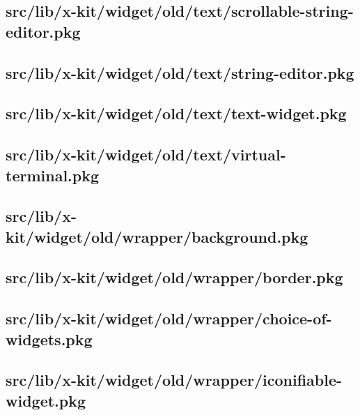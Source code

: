 \subsection{src/lib/x-kit/widget/old/text/scrollable-string-editor.pkg}


\subsection{src/lib/x-kit/widget/old/text/string-editor.pkg}


\subsection{src/lib/x-kit/widget/old/text/text-widget.pkg}


\subsection{src/lib/x-kit/widget/old/text/virtual-terminal.pkg}


\subsection{src/lib/x-kit/widget/old/wrapper/background.pkg}


\subsection{src/lib/x-kit/widget/old/wrapper/border.pkg}


\subsection{src/lib/x-kit/widget/old/wrapper/choice-of-widgets.pkg}


\subsection{src/lib/x-kit/widget/old/wrapper/iconifiable-widget.pkg}


